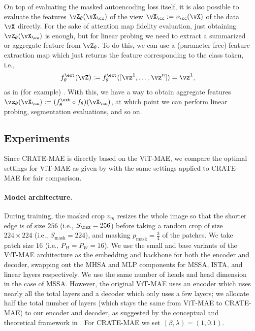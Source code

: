 \documentclass[../../book-main.tex]{subfiles}
\begin{document}
On top of evaluating the masked autoencoding loss itself, it is also possible to evaluate the features \(\vZ_{\theta}(\vX_{\cc})\) of the view \(\vX_{\cc} := v_{\cc}(\vX)\) of the data \(\vX\) directly. For the sake of attention map fidelity evaluation, just obtaining \(\vZ_{\theta}(\vX_{\cc})\) is enough, but for linear probing we need to extract a summarized or aggregate feature from \(\vZ_{\theta}\). To do this, we can use a (parameter-free) feature extraction map which just returns the feature corresponding to the class token, i.e.,
\begin{equation}
    f_{\theta}^{\ext}(\vZ) := f_{\theta}^{\ext}([\vz^{1}, \dots, \vz^{n}]) = \vz^{1},
\end{equation}
as in (for example) . With this, we have a way to obtain aggregate features \(\vz_{\theta}(\vX_{\cc}) := (f_{\theta}^{\ext} \circ f_{\theta})(\vX_{\cc})\), at which point we can perform linear probing, segmentation evaluations, and so on.

\subsection{Experiments}\label{sub:image_completion_experiments}

Since CRATE-MAE is directly based on the ViT-MAE, we compare the optimal settings for ViT-MAE as given by \citep{he2022masked} with the same settings applied to CRATE-MAE for fair comparison.

\paragraph{Model architecture.} During training, the masked crop \(v_{m}\) resizes the whole image so that the shorter edge is of size \(256\) (i.e., \(S_{\rsz} = 256\)) before taking a random crop of size \(224 \times 224\) (i.e., \(S_{\mathrm{mask}} = 224\)), and masking \(p_{\mathrm{mask}} = \frac{3}{4}\) of the patches. We take patch size \(16\) (i.e., \(P_{H} = P_{W} = 16\)). We use the small and base variants of the ViT-MAE architecture as the embedding and backbone for both the encoder and decoder, swapping out the MHSA and MLP components for MSSA, ISTA, and linear layers respectively. We use the same number of heads and head dimension in the case of MSSA. However, the original ViT-MAE uses an encoder which uses nearly all the total layers and a decoder which only uses a few layers; we allocate half the total number of layers (which stays the same from ViT-MAE to CRATE-MAE) to our encoder and decoder, as suggested by the conceptual and theoretical framework in . For CRATE-MAE we set \((\beta, \lambda) = (1, 0.1)\).
\end{document}
